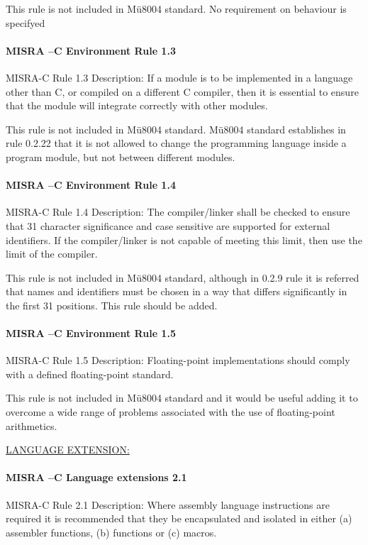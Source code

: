 This rule is not included in Mü8004 standard. No requirement on behaviour is specifyed

\paragraph{MISRA –C Environment Rule 1.3}
MISRA-C Rule 1.3 Description: If a module is to be implemented in a language other than C, or compiled on a different C compiler, then it is essential to ensure that the module will integrate correctly with other modules.

This rule is not included in Mü8004 standard. Mü8004 standard establishes in rule 0.2.22 that it is not allowed to change the programming language inside a program module, but not between different modules.

\paragraph{MISRA –C Environment Rule 1.4}
MISRA-C Rule 1.4 Description: The compiler/linker shall be checked to ensure that 31 character significance and case sensitive are supported for external identifiers. If the compiler/linker is not capable of meeting this limit, then use the limit of the compiler.

This rule is not included in Mü8004 standard, although in 0.2.9 rule it is referred that names and identifiers must be chosen in a way that differs significantly in the first 31 positions. This rule should be added.

\paragraph{MISRA –C Environment Rule 1.5}
MISRA-C Rule 1.5 Description: Floating-point implementations should comply with a defined floating-point standard.

This rule is not included in Mü8004 standard and it would be useful adding it to overcome a wide range of problems associated with the use of floating-point arithmetics.

\begin{center}
\textsc{\underline{LANGUAGE EXTENSION:}}
\end{center}

\paragraph{MISRA –C Language extensions 2.1}
MISRA-C Rule 2.1 Description: Where assembly language instructions are required it is recommended that they be encapsulated and isolated in either (a) assembler functions, (b) functions or (c) macros.


